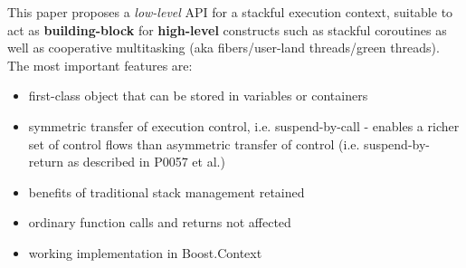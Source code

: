 This paper proposes a \emph{low-level} API for a stackful execution context,
suitable to act as {\bfseries building-block} for {\bfseries high-level}
constructs such as stackful coroutines as well as cooperative
multitasking (aka fibers/user-land threads/green threads).\\
\newline
The most important features are:
\begin{itemize}
    \item first-class object that can be stored in variables or containers
    \item symmetric transfer of execution control, i.e. suspend-by-call -
          enables a richer set of control flows than asymmetric transfer of
          control (i.e. suspend-by-return as described in P0057\cite{P0057} et al.)
    \item benefits of traditional stack management retained
    \item ordinary function calls and returns not affected
    \item working implementation in Boost.Context\cite{bcontext}
\end{itemize}
